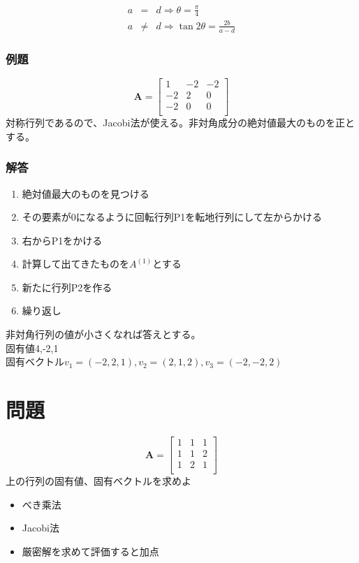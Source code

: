 \documentclass[a4j,twoside,openright,11pt]{jsarticle}
\begin{document}
\begin{eqnarray}
a &=&d \Rightarrow \theta =\frac{\pi}{4}\\
a &\neq& d \Rightarrow \tan 2\theta = \frac{2b}{a-d} 
\end{eqnarray}

\subsubsection{例題}
\[
\bm{A}=
  \left[
    \begin{array}{rrr}
      1  & -2 & -2 \\
      -2 & 2 & 0 \\
      -2 & 0 & 0 \\
    \end{array}
  \right]
\]
対称行列であるので、Jacobi法が使える。非対角成分の絶対値最大のものを正とする。
\subsubsection{解答}
\begin{enumerate}
\item 絶対値最大のものを見つける
\item その要素が0になるように回転行列P1を転地行列にして左からかける
\item 右からP1をかける
\item 計算して出てきたものを$A^{(1)}$とする
\item 新たに行列P2を作る
\item 繰り返し
\end{enumerate}
非対角行列の値が小さくなれば答えとする。\\
固有値4,-2,1\\
固有ベクトル$v_1=(-2,2,1),v_2=(2,1,2),v_3=(-2,-2,2)$
\section*{問題}
\[
\bm{A}=
  \left[
    \begin{array}{rrr}
      1 & 1 & 1 \\
      1 & 1 & 2 \\
      1 & 2 & 1 \\
    \end{array}
  \right]
\]
上の行列の固有値、固有ベクトルを求めよ\\

\begin{itemize}
\item べき乘法
\item Jacobi法
\item 厳密解を求めて評価すると加点
\end{itemize}
\end{document}
